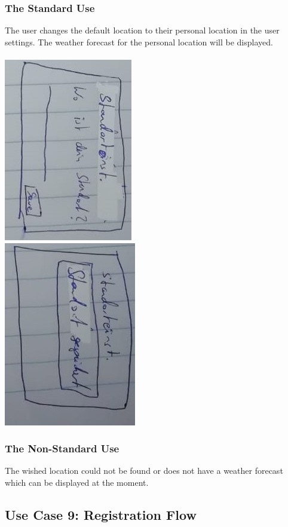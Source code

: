 \documentclass[12pt]{article}
\theoremstyle{definition}
\begin{document}
\subsubsection{The Standard Use}
The user changes the default location to their personal location in the user settings.
The weather forecast for the personal location will be displayed. \\\\
\includegraphics[angle=90,scale=.8]{UseCase/Standorteingabe.jpeg}\\
\includegraphics[angle=90,scale=.8]{UseCase/StandortGespeichert.jpeg}\\

\subsubsection{The Non-Standard Use}
The wished location could not be found or does not have a weather forecast which can be displayed at the moment.

\subsection{Use Case 9: Registration Flow}
\end{document}
